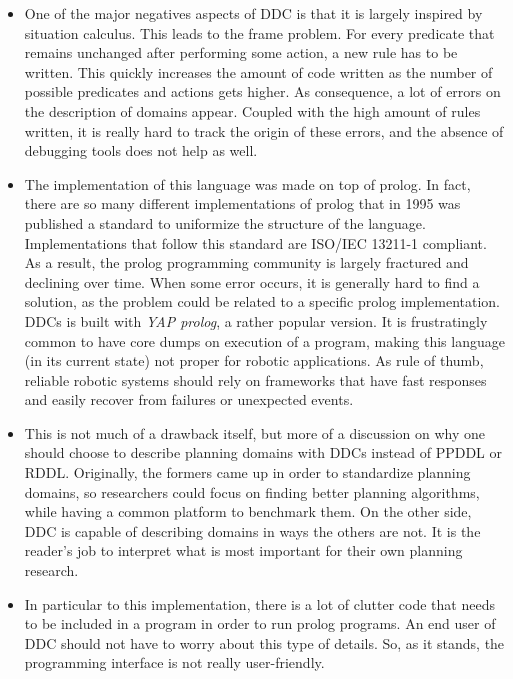\begin{itemize}
    \item One of the major negatives aspects of \gls{DDC} is that it is largely
    inspired by situation calculus. This leads to the frame problem. For every
    predicate that remains unchanged after performing some action, a new rule
    has to be written. This quickly increases the amount of code written as the
    number of possible predicates and actions gets higher. As consequence,
    a lot of errors on the description of domains appear. Coupled with the high
    amount of rules written, it is really hard to track the origin of these errors,
    and the absence of debugging tools does not help as well.

    \item The implementation of this language was made on top of prolog. In fact,
    there are so many different implementations of prolog that in 1995 was
    published a standard to uniformize the structure of the language.
    Implementations that follow this standard are ISO/IEC 13211-1 compliant. As
    a result, the prolog programming community is largely fractured and
    declining over time.
    When some error occurs, it is generally hard to find a solution, as the
    problem could be related to a specific prolog implementation. \glspl{DDC} is
    built with \textit{YAP prolog}, a rather popular version.
    It is frustratingly common to have core dumps on execution of a program,
    making this language (in its current state) not proper for robotic
    applications. As rule of thumb, reliable robotic systems should rely on
    frameworks that have fast responses and easily recover from failures or
    unexpected events.

    \item This is not much of a drawback itself, but more of a discussion on
    why one should choose to describe planning domains with \glspl{DDC} instead
    of \gls{PPDDL} or \gls{RDDL}. Originally, the formers came up in order to
    standardize planning domains, so researchers could focus on finding better
    planning algorithms, while having a common platform to benchmark them. On
    the other side, \gls{DDC} is capable of describing domains in ways the
    others are not.
    It is the reader's job to interpret what is most important for their own
    planning research.

    \item In particular to this implementation, there is a lot of clutter code
    that needs to be included in a program in order to run prolog programs. An
    end user of \gls{DDC} should not have to worry about this type of details.
    So, as it stands, the programming interface is not really user-friendly.


\end{itemize}
